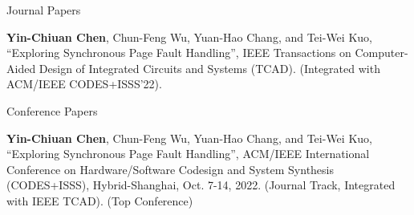 

\begin{cventries}

  \cvpub
    {Journal Papers}
    {
      \begin{cvitems}
        \item {\textbf{Yin-Chiuan Chen}, Chun-Feng Wu, Yuan-Hao Chang, and Tei-Wei Kuo, “Exploring Synchronous Page Fault Handling”, IEEE Transactions on Computer-Aided Design of Integrated Circuits and Systems (TCAD). (Integrated with ACM/IEEE CODES+ISSS’22).}
      \end{cvitems}
    }
  \cvpub
    {Conference Papers}
    {
      \begin{cvitems}
        \item {\textbf{Yin-Chiuan Chen}, Chun-Feng Wu, Yuan-Hao Chang, and Tei-Wei Kuo, “Exploring Synchronous Page Fault Handling”, ACM/IEEE International Conference on Hardware/Software Codesign and System Synthesis (CODES+ISSS), Hybrid-Shanghai, Oct. 7-14, 2022. (Journal Track, Integrated with IEEE TCAD). (Top Conference)}
      \end{cvitems}
    }

\end{cventries}